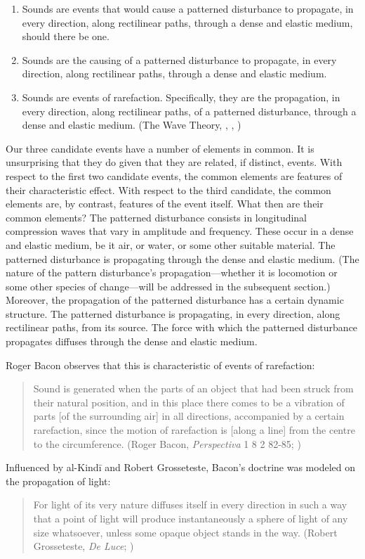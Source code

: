 \documentclass[12pt]{article}
\begin{document}
\begin{enumerate}
	\item Sounds are events that would cause a patterned disturbance to propagate, in every direction, along rectilinear paths, through a dense and elastic medium, should there be one. \citep{Casati:1994aa}
	\item Sounds are the causing of a patterned disturbance to propagate, in every direction, along rectilinear paths, through a dense and elastic medium. \citep{OCallaghan:2007xy}
	\item Sounds are events of rarefaction. Specifically, they are the propagation, in every direction, along rectilinear paths, of a patterned disturbance, through a dense and elastic medium. (The Wave Theory, \citealt{OShaughnessy:2009aa}, \citealt{Sorensen:2009aa}, \citealt[chapters 3–4]{Kalderon:2018oe})
\end{enumerate}
Our three candidate events have a number of elements in common. It is unsurprising that they do given that they are related, if distinct, events. With respect to the first two candidate events, the common elements are features of their characteristic effect. With respect to the third candidate, the common elements are, by contrast, features of the event itself. What then are their common elements? The patterned disturbance consists in longitudinal compression waves that vary in amplitude and frequency. These occur in a dense and elastic medium, be it air, or water, or some other suitable material. The patterned disturbance is propagating through the dense and elastic medium. (The nature of the pattern disturbance's propagation---whether it is locomotion or some other species of change---will be addressed in the subsequent section.) Moreover, the propagation of the patterned disturbance has a certain dynamic structure. The patterned disturbance is propagating, in every direction, along rectilinear paths, from its source. The force with which the patterned disturbance propagates diffuses through the dense and elastic medium. 

Roger Bacon observes that this is characteristic of events of rarefaction:
\begin{quote}
	Sound is generated when the parts of an object that had been struck from their natural position, and in this place there comes to be a vibration of parts [of the surrounding air] in all directions, accompanied by a certain rarefaction, since the motion of rarefaction is [along a line] from the centre to the circumference. (Roger Bacon, \emph{Perspectiva} 1 8 2 82-85; \citealt{Lindberg:1996bk})
\end{quote}
Influenced by al-Kindī and Robert Grosseteste, Bacon’s doctrine was modeled on the propagation of light:
\begin{quote}
	For light of its very nature diffuses itself in every direction in such a way that a point of light will produce instantaneously a sphere of light of any size whatsoever, unless some opaque object stands in the way. (Robert Grosseteste, \emph{De Luce}; \citealt[10]{Riedl:1942it})
\end{quote}
\end{document}
